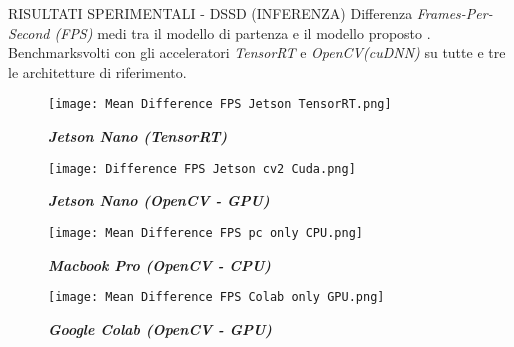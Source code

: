 
\begin{frame}{RISULTATI SPERIMENTALI - DSSD (INFERENZA)}
    \renewcommand{\thefootnote}{\fnsymbol{footnote}}
    Differenza \emph{Frames-Per-Second (FPS)} medi tra il modello di partenza 
    {} e il modello proposto {}. Benchmark\footnotemark[1] svolti con gli acceleratori 
    \emph{TensorRT} e \emph{OpenCV(cuDNN)} su tutte e tre le architetture di riferimento.\\
    \vspace{0.2cm}
    \begin{minipage}{\linewidth}
        \centering
        \begin{minipage}{0.45\linewidth}
            \begin{figure}
                \centering
                \texttt{[image: Mean Difference FPS Jetson TensorRT.png]}
                \centering
                \vspace{-0.7cm} 
                \caption{{\bfseries{\emph{Jetson Nano (TensorRT)}}}}
            \end{figure}
        \end{minipage}
        \begin{minipage}{0.45\linewidth}
            \begin{figure}
                \centering
                \texttt{[image: Difference FPS Jetson cv2 Cuda.png]}
                \centering
                \vspace{-0.7cm} 
                \caption{{\bfseries{\emph{Jetson Nano (OpenCV - GPU)}}}}
            \end{figure}
        \end{minipage}
    \end{minipage}
    \begin{minipage}{\linewidth}
        \centering
        \begin{minipage}{0.45\linewidth}
            \begin{figure}
                \centering
                \texttt{[image: Mean Difference FPS pc only CPU.png]}
                \centering
                \vspace{-0.7cm} 
                \caption{{\bfseries{\emph{Macbook Pro (OpenCV - CPU)}}}}
            \end{figure}
        \end{minipage}
        \begin{minipage}{0.45\linewidth}
            \begin{figure}
                \centering
                \texttt{[image: Mean Difference FPS Colab only GPU.png]}
                \centering
                \vspace{-0.7cm} 
                \caption{{\bfseries{\emph{Google Colab (OpenCV - GPU)}}}}
            \end{figure}
        \end{minipage}
    \end{minipage}
\end{frame}
